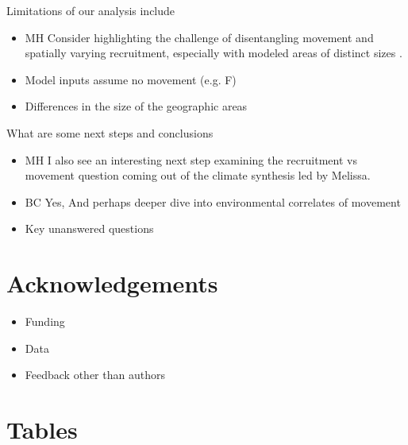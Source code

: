\documentclass{article}
\begin{document}
\noindent Limitations of our analysis include
\begin{itemize}
\item MH Consider highlighting the challenge of disentangling movement and spatially varying recruitment, especially with modeled areas of distinct sizes \cite[][]{cadrin2019}. 
\item Model inputs assume no movement (e.g. F)
\item Differences in the size of the geographic areas
\end{itemize}

\noindent What are some next steps and conclusions
\begin{itemize}
\item MH I also see an interesting next step examining the recruitment vs movement question coming out of the climate synthesis led by Melissa. 
\item BC Yes, And perhaps deeper dive into environmental correlates of movement
\item Key unanswered questions
\end{itemize}

\section{Acknowledgements}
\begin{itemize}
\item Funding
\item Data
\item Feedback other than authors
\end{itemize}

\newpage




\newpage
\section{Tables}
\end{document}
